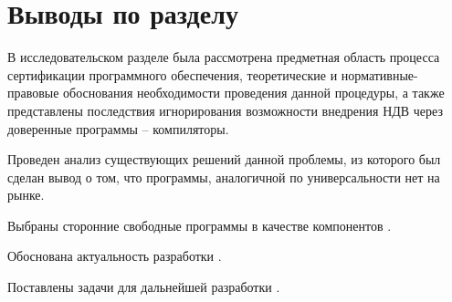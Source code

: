 \section*{Выводы по разделу}\label{sec:ch1/sec5}
В исследовательском разделе была рассмотрена предметная область процесса
сертификации программного обеспечения, теоретические и нормативные-правовые 
обоснования необходимости проведения данной процедуры, а также представлены
последствия игнорирования возможности внедрения НДВ  через доверенные программы --
компиляторы.

Проведен анализ существующих решений данной проблемы, из которого был сделан
вывод о том, что программы, аналогичной по универсальности {\ProgModule} нет на рынке.

Выбраны сторонние свободные программы в качестве компонентов {\ProgModule}.

Обоснована актуальность разработки {\ProgModule}.

Поставлены задачи для дальнейшей разработки {\ProgModule}.
